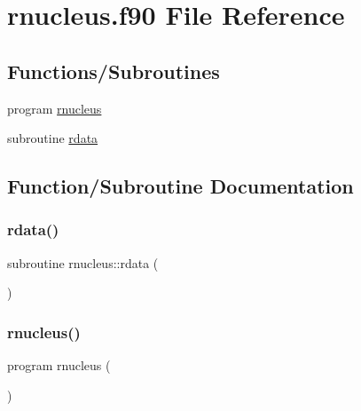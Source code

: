 \hypertarget{rnucleus_8f90}{}\section{rnucleus.\+f90 File Reference}
\label{rnucleus_8f90}
\subsection*{Functions/\+Subroutines}
\begin{DoxyCompactItemize}
\item 
program \mbox{\hyperlink{rnucleus_8f90_a56a1a777539e1bb42b8a628e10cbbd06}{rnucleus}}
\item 
subroutine \mbox{\hyperlink{rnucleus_8f90_a9316fac30381428af80dbdba354f78b2}{rdata}}
\end{DoxyCompactItemize}


\subsection{Function/\+Subroutine Documentation}
\mbox{\label{rnucleus_8f90_a9316fac30381428af80dbdba354f78b2}} 
\subsubsection{\texorpdfstring{rdata()}{rdata()}}
{\footnotesize\ttfamily subroutine rnucleus\+::rdata (\begin{DoxyParamCaption}{ }\end{DoxyParamCaption})}

\mbox{\label{rnucleus_8f90_a56a1a777539e1bb42b8a628e10cbbd06}} 
\subsubsection{\texorpdfstring{rnucleus()}{rnucleus()}}
{\footnotesize\ttfamily program rnucleus (\begin{DoxyParamCaption}{ }\end{DoxyParamCaption})}

